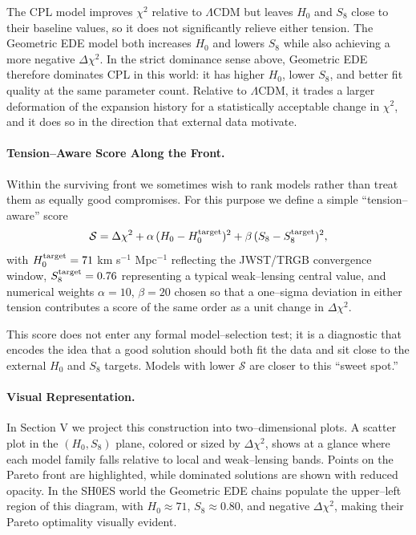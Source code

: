 \documentclass[a4paper,11pt]{article}
\begin{document}
The CPL model improves $\chi^2$ relative to $\Lambda$CDM but leaves $H_0$ and $S_8$ close to their baseline values, so it does not significantly relieve either tension. The Geometric EDE model both increases $H_0$ and lowers $S_8$ while also achieving a more negative $\Delta\chi^2$. In the strict dominance sense above, Geometric EDE therefore dominates CPL in this world: it has higher $H_0$, lower $S_8$, and better fit quality at the same parameter count. Relative to $\Lambda$CDM, it trades a larger deformation of the expansion history for a statistically acceptable change in $\chi^2$, and it does so in the direction that external data motivate.

\paragraph{Tension--Aware Score Along the Front.}
Within the surviving front we sometimes wish to rank models rather than treat them as equally good compromises. For this purpose we define a simple ``tension--aware'' score
\begin{equation}
\mathcal{S} = \Delta\chi^2 + \alpha\,(H_0 - H_0^{\rm target})^2 + \beta\,(S_8 - S_8^{\rm target})^2,
\end{equation}
with $H_0^{\rm target} = 71$ km s$^{-1}$ Mpc$^{-1}$ reflecting the JWST/TRGB convergence window, $S_8^{\rm target} = 0.76$ representing a typical weak--lensing central value, and numerical weights $\alpha = 10$, $\beta = 20$ chosen so that a one--sigma deviation in either tension contributes a score of the same order as a unit change in $\Delta\chi^2$.

This score does not enter any formal model--selection test; it is a diagnostic that encodes the idea that a good solution should both fit the data and sit close to the external $H_0$ and $S_8$ targets. Models with lower $\mathcal{S}$ are closer to this ``sweet spot.''

\paragraph{Visual Representation.}
In Section V we project this construction into two--dimensional plots. A scatter plot in the $(H_0, S_8)$ plane, colored or sized by $\Delta\chi^2$, shows at a glance where each model family falls relative to local and weak--lensing bands. Points on the Pareto front are highlighted, while dominated solutions are shown with reduced opacity. In the SH0ES world the Geometric EDE chains populate the upper--left region of this diagram, with $H_0 \approx 71$, $S_8 \approx 0.80$, and negative $\Delta\chi^2$, making their Pareto optimality visually evident.
\end{document}
